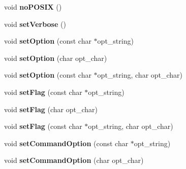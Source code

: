 \begin{DoxyCompactItemize}
\item 
void {\bfseries no\+P\+O\+S\+IX} ()\hypertarget{class_any_option_aeca5328f5046690e0d381c745c1872d5}{}\label{class_any_option_aeca5328f5046690e0d381c745c1872d5}

\item 
void {\bfseries set\+Verbose} ()\hypertarget{class_any_option_a0db06dc9828c5242889610afcc740141}{}\label{class_any_option_a0db06dc9828c5242889610afcc740141}

\item 
void {\bfseries set\+Option} (const char $\ast$opt\+\_\+string)\hypertarget{class_any_option_a72320922fa1b9f02d7e744f517dcf479}{}\label{class_any_option_a72320922fa1b9f02d7e744f517dcf479}

\item 
void {\bfseries set\+Option} (char opt\+\_\+char)\hypertarget{class_any_option_a45d3a142b3b222239640cb15febba737}{}\label{class_any_option_a45d3a142b3b222239640cb15febba737}

\item 
void {\bfseries set\+Option} (const char $\ast$opt\+\_\+string, char opt\+\_\+char)\hypertarget{class_any_option_abc37993c84c44c368e9ec1d425c913f5}{}\label{class_any_option_abc37993c84c44c368e9ec1d425c913f5}

\item 
void {\bfseries set\+Flag} (const char $\ast$opt\+\_\+string)\hypertarget{class_any_option_a674db5274da842af95a58067e49a8808}{}\label{class_any_option_a674db5274da842af95a58067e49a8808}

\item 
void {\bfseries set\+Flag} (char opt\+\_\+char)\hypertarget{class_any_option_a1e90db23b41021bd60d4ecdf0e169eb4}{}\label{class_any_option_a1e90db23b41021bd60d4ecdf0e169eb4}

\item 
void {\bfseries set\+Flag} (const char $\ast$opt\+\_\+string, char opt\+\_\+char)\hypertarget{class_any_option_a6b644d13279528d3c501323f9826f103}{}\label{class_any_option_a6b644d13279528d3c501323f9826f103}

\item 
void {\bfseries set\+Command\+Option} (const char $\ast$opt\+\_\+string)\hypertarget{class_any_option_a7df8a4d9c0970f018c91b04bd4c11022}{}\label{class_any_option_a7df8a4d9c0970f018c91b04bd4c11022}

\item 
void {\bfseries set\+Command\+Option} (char opt\+\_\+char)\hypertarget{class_any_option_a639b708b4c3953e7017f224b9b8082b3}{}\label{class_any_option_a639b708b4c3953e7017f224b9b8082b3}


\end{DoxyCompactItemize}
